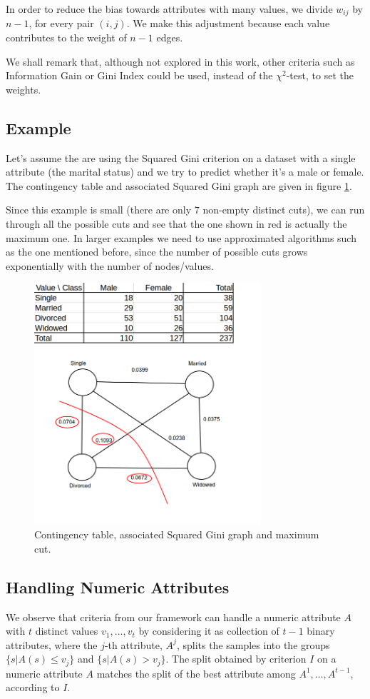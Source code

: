 In order to reduce the bias towards attributes with many values, we divide 
$w_{ij}$ by  $n-1$, for every pair $(i,j)$. We make this adjustment  because each value contributes
to the weight of $n-1$ edges.

We shall remark that, although not explored in this work,
other criteria such as Information Gain or Gini Index
could be used, instead of the $\chi^2$-test, to
set the weights.


\subsection{Example}

Let's assume the are using the Squared Gini criterion on a dataset with a single attribute (the marital status) and we try to predict whether it's a male or female. The contingency table and associated Squared Gini graph are given in figure \ref{fig:cut-example}.

Since this example is small (there are only $7$ non-empty distinct cuts), we can run through all the possible cuts and see that the one shown in red is actually the maximum one. In larger examples we need to use approximated algorithms such as the one mentioned before, since the number of possible cuts grows exponentially with the number of nodes/values.

\begin{figure}[h]
\centering
\includegraphics[width=0.75\textwidth]{cut-example2}
\caption{Contingency table, associated Squared Gini graph and maximum cut.}
\label{fig:cut-example}
\end{figure}

\subsection{Handling Numeric Attributes}
We observe  that criteria from our framework can handle
 a numeric attribute $A$ with $t$ distinct values
$v_1,\ldots,v_t$
by considering it as collection of 
$t-1$ binary attributes, where the
$j$-th attribute, $A^j$,  splits the samples into the
groups $\{s | A(s) \le v_j \}$ and $\{s | A(s) > v_j \}$. 
The split  obtained by criterion $I$ on a numeric attribute
$A$ matches the split of  the best attribute 
among $A^1,\ldots,A^ {t-1}$, according to $I$.
